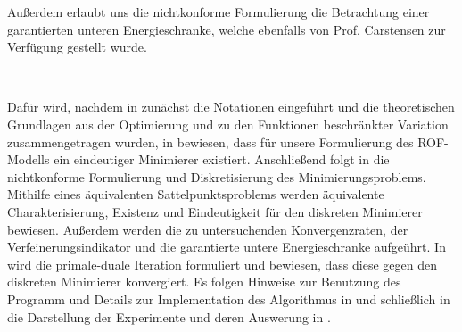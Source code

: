 Außerdem erlaubt uns die nichtkonforme Formulierung die Betrachtung einer
garantierten unteren Energieschranke, welche ebenfalls von Prof. Carstensen
zur Verfügung gestellt wurde.

\medskip
--------------------------------
\medskip

Dafür wird, nachdem in  zunächst die Notationen
eingeführt und die theoretischen Grundlagen aus der Optimierung und zu den
Funktionen beschränkter Variation zusammengetragen wurden, in
 bewiesen, dass für unsere Formulierung des
ROF-Modells ein eindeutiger
Minimierer existiert.
Anschließend folgt in  die nichtkonforme Formulierung
und Diskretisierung des Minimierungsproblems. Mithilfe eines
äquivalenten Sattelpunktsproblems werden äquivalente Charakterisierung, 
Existenz und Eindeutigkeit für den diskreten Minimierer bewiesen. Außerdem
werden die zu untersuchenden Konvergenzraten, der Verfeinerungsindikator und
die garantierte untere Energieschranke aufgeührt.
In  wird die primale-duale Iteration formuliert und bewiesen,
dass diese gegen den diskreten Minimierer konvergiert. 
Es folgen Hinweise zur Benutzung des Programm und Details zur Implementation
des Algorithmus in  und schließlich in
 die Darstellung der Experimente und deren Auswerung in
.


